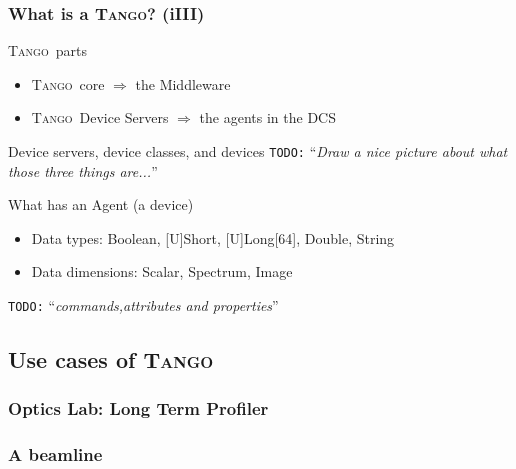 \documentclass{beamer}
\newcommand{\tango}{\textsc{Tango}}
\newcommand{\onmiORB}{\textsc{omniORB}}
\newcommand{\zmq}{\textsc{$\varnothing$mq}}
\newcommand{\mysql}{\textsc{MySQL}}
\newcommand{\sardana}{\textsc{Sardana}}
\newcommand{\atk}{\textsc{Atk}}
\newcommand{\taurus}{\textsc{Taurus}}
\newcommand{\todo}[1]{\texttt{\color{red}TODO:} ``\emph{#1}''}
\begin{document}
\begin{frame}
\frametitle{What is a \tango? (iIII)}
    \begin{block}{\tango\, parts}
        \begin{itemize}
            \item \tango\, core $\Rightarrow$ the Middleware
            \item \tango\, Device Servers $\Rightarrow$ the agents in the DCS
        \end{itemize}
    \end{block}
    \begin{exampleblock}{Device servers, device classes, and devices}
        \todo{Draw a nice picture about what those three things are...}
    \end{exampleblock}
    \begin{block}{What has an Agent (a device)}
        \begin{itemize}
            \item Data types: Boolean, [U]Short, [U]Long[64], Double, String
            \item Data dimensions: Scalar, Spectrum, Image
        \end{itemize}
        \todo{commands,attributes and properties}
    \end{block}
\end{frame}

\subsection{Use cases of \tango}

\begin{frame}
\frametitle{Optics Lab: Long Term Profiler}
\end{frame}

\begin{frame}
\frametitle{A beamline}
\end{frame}
\end{document}
